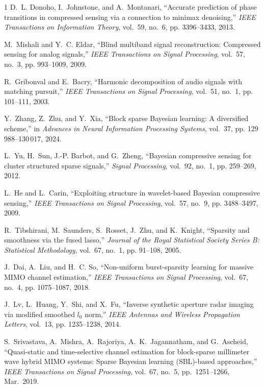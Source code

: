 \documentclass[lettersize,journal]{IEEEtran}
\theoremstyle{remark}
\begin{document}
\begin{thebibliography}{1}
D.~L. Donoho, I.~Johnstone, and A.~Montanari, ``Accurate prediction of phase
transitions in compressed sensing via a connection to minimax denoising,''
\emph{IEEE Transactions on Information Theory}, vol.~59, no.~6, pp.
3396--3433, 2013.

M.~Mishali and Y.~C. Eldar, ``Blind multiband signal reconstruction: Compressed
sensing for analog signals,'' \emph{IEEE Transactions on Signal Processing},
vol.~57, no.~3, pp. 993--1009, 2009.

R.~Gribonval and E.~Bacry, ``Harmonic decomposition of audio signals with
matching pursuit,'' \emph{IEEE Transactions on Signal Processing}, vol.~51,
no.~1, pp. 101--111, 2003.

Y.~Zhang, Z.~Zhu, and Y.~Xia, ``Block sparse {Bayesian} learning: A diversified
scheme,'' in \emph{Advances in Neural Information Processing Systems},
vol.~37, pp. 129\,988--130\,017, 2024.

L.~Yu, H.~Sun, J.-P. Barbot, and G.~Zheng, ``Bayesian compressive sensing for
cluster structured sparse signals,'' \emph{Signal Processing}, vol.~92,
no.~1, pp. 259--269, 2012.

L.~He and L.~Carin, ``Exploiting structure in wavelet-based {Bayesian}
compressive sensing,'' \emph{IEEE Transactions on Signal Processing},
vol.~57, no.~9, pp. 3488--3497, 2009.

R.~Tibshirani, M.~Saunders, S.~Rosset, J.~Zhu, and K.~Knight, ``Sparsity and
smoothness via the fused lasso,'' \emph{Journal of the Royal Statistical
	Society Series B: Statistical Methodology}, vol.~67, no.~1, pp. 91--108,
2005.

J.~Dai, A.~Liu, and H.~C. So, ``Non-uniform burst-sparsity learning for massive
{MIMO} channel estimation,'' \emph{IEEE Transactions on Signal Processing},
vol.~67, no.~4, pp. 1075--1087, 2018.

J.~Lv, L.~Huang, Y.~Shi, and X.~Fu, ``Inverse synthetic aperture radar imaging
via modified smoothed $ l_0$  norm,'' \emph{IEEE Antennas and
	Wireless Propagation Letters}, vol.~13, pp. 1235--1238, 2014.
	
	S.~Srivastava, A.~Mishra, A.~Rajoriya, A.~K.~Jagannatham, and G.~Ascheid,
	``Quasi-static and time-selective channel estimation for block-sparse millimeter wave hybrid MIMO systems: Sparse Bayesian learning (SBL)-based approaches,''
	\emph{IEEE Transactions on Signal Processing},
	vol.~67, no.~5, pp.~1251--1266, Mar.~2019.
	

\end{thebibliography}
\end{document}
